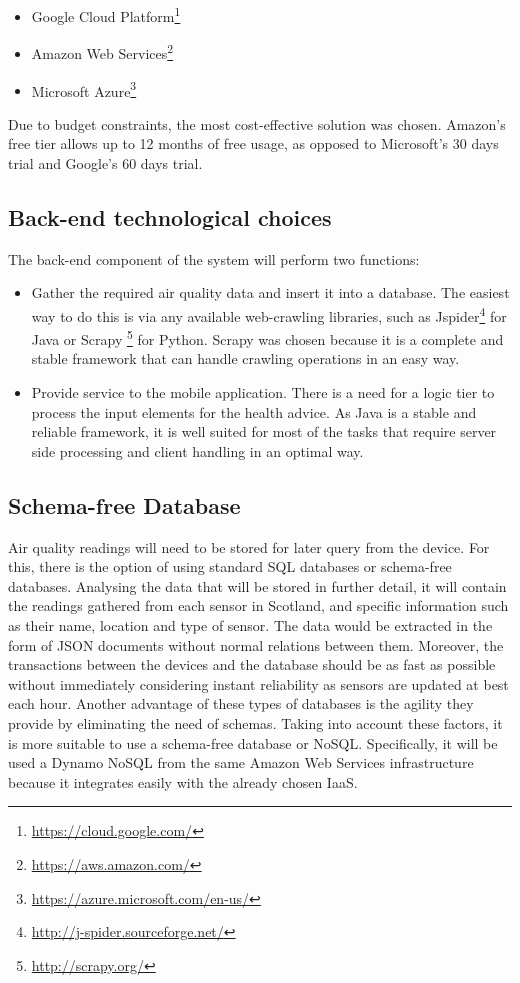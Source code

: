 \begin{itemize}
	\item Google Cloud Platform\footnote{\url{https://cloud.google.com/}}
    \item Amazon Web Services\footnote{\url{https://aws.amazon.com/}}
    \item Microsoft Azure\footnote{\url{https://azure.microsoft.com/en-us/}}
\end{itemize}

Due to budget constraints, the most cost-effective solution was chosen. Amazon's free tier allows up to 12 months of free usage, as opposed to Microsoft's 30 days trial and Google's 60 days trial.

\subsection{Back-end technological choices}
The back-end component of the system will perform two functions: 

\begin{itemize}
	\item Gather the required air quality data and insert it into a database. The easiest way to do this is via any available web-crawling libraries, such as Jspider\footnote{\url{http://j-spider.sourceforge.net/}} for Java or Scrapy \footnote{\url{http://scrapy.org/}} for Python. Scrapy was chosen because it is a complete and stable framework that can handle crawling operations in an easy way. 
	\item Provide service to the mobile application. There is a need for a logic tier to process the input elements for the health advice. As Java is a stable and reliable framework,  it is well suited for most of the tasks that require server side processing and client handling in an optimal way.
\end{itemize}

\subsection{Schema-free Database}

Air quality readings will need to be stored for later query from the device. For this, there is the option of using standard SQL databases or schema-free databases. Analysing the data that will be stored in further detail, it will contain the readings gathered from each sensor in Scotland, and specific information such as their name, location and type of sensor. The data would be extracted in the form of JSON documents without normal relations between them. Moreover, the transactions between the devices and the database should be as fast as possible without immediately considering instant reliability as sensors are updated at best each hour. Another advantage of these types of databases is the agility they provide by eliminating the need of schemas. Taking into account these factors, it is more suitable to use a schema-free database or NoSQL. Specifically, it will be used a Dynamo NoSQL from the same Amazon Web Services infrastructure because it integrates easily with the already chosen IaaS.

